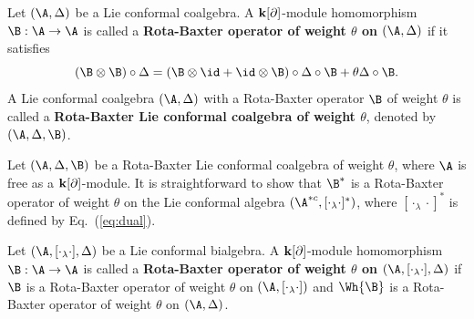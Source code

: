 \documentclass[12pt]{amsart}
\begin{document}
\begin{definition}
    Let $(\A,\Delta)$ be a Lie conformal coalgebra. A ${\bf k}[\partial]$-module homomorphism $\B: \A \rightarrow\A$ is called a {\bf  Rota-Baxter operator  of weight $\theta$ on $(\A,\Delta)$ } if it satisfies
    \begin{equation}\label{bd}
        (\B\otimes \B)\circ\Delta=(\B\otimes \id+\id\otimes\B )\circ\Delta \circ \B + \theta\Delta \circ \B.
    \end{equation}
    A Lie conformal coalgebra $(\A,\Delta)$ with a Rota-Baxter operator $\B$ of weight $\theta$ is called a {\bf   Rota-Baxter Lie conformal coalgebra of weight  $\theta$}, denoted by $(\A,\Delta,\B)$.
\end{definition}
\begin{remark}\label{rmk-rblcca}
    Let $(\A,\Delta,\B)$ be a   Rota-Baxter Lie conformal coalgebra of weight  $\theta$,
    where $\A$ is free as a ${\bf k}[\partial]$-module. It is straightforward to show that $ \B^*$ is a Rota-Baxter operator of weight $\theta$ on the Lie conformal algebra $(\A^{\ast c},[\cdot_\lambda \cdot]^\ast)$,
     where $[\cdot_\lambda \cdot]^\ast$ is defined by
     Eq.~(\ref{eq:dual}).
\end{remark}
\begin{definition}
    Let $(\A,[\cdot_\lambda\cdot],\Delta)$ be a Lie conformal bialgebra. A ${\bf k}[\partial]$-module homomorphism $\B: \A \rightarrow\A$ is called a {\bf  Rota-Baxter operator  of weight $\theta$ on $(\A,[\cdot_\lambda\cdot],\Delta)$ } if $\B$ is a Rota-Baxter operator of weight $\theta$ on $(\A,[\cdot_\lambda\cdot])$ and $\Wh{\B}$ is a Rota-Baxter operator of weight $\theta$ on $(\A,\Delta)$.
\end{definition}
\end{document}
